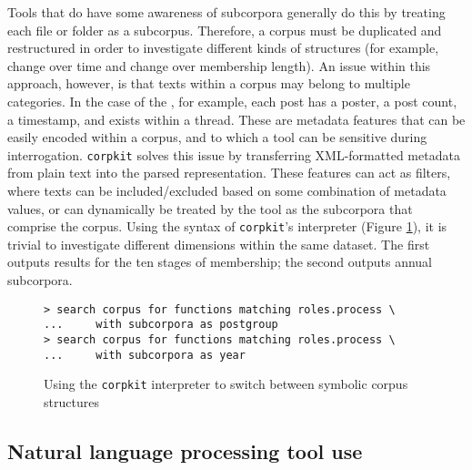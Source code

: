 Tools that do have some awareness of subcorpora generally do this by treating each file or folder as a subcorpus. Therefore, a corpus must be duplicated and restructured in order to investigate different kinds of structures (for example, change over time and change over membership length). An issue within this approach, however, is that texts within a corpus may belong to multiple categories. In the case of the , for example, each \gls{post} has a poster, a post count, a timestamp, and exists within a \gls{thread}. These are metadata features that can be easily encoded within a \gls{corpus}, and to which a tool can be sensitive during interrogation. \texttt{corpkit} solves this issue by transferring \gls{XML}\hyp{}formatted metadata from plain text into the parsed representation. These features can act as filters, where texts can be included\slash excluded based on some combination of metadata values, or can dynamically be treated by the tool as the subcorpora that comprise the corpus. Using the syntax of \texttt{corpkit}'s interpreter (Figure \ref{fig:interpreter-subcorpora}), it is trivial to investigate different dimensions within the same dataset. The first outputs results for the ten stages of membership; the second outputs annual subcorpora.

\begin{figure}[htb]
\begin{verbatim}
> search corpus for functions matching roles.process \
...     with subcorpora as postgroup
> search corpus for functions matching roles.process \
...     with subcorpora as year
\end{verbatim}
\caption[Switching between symbolic corpus structures]{Using the \texttt{corpkit} interpreter to switch between symbolic corpus structures}
\label{fig:interpreter-subcorpora}
\end{figure}

\subsection{Natural language processing tool use}

